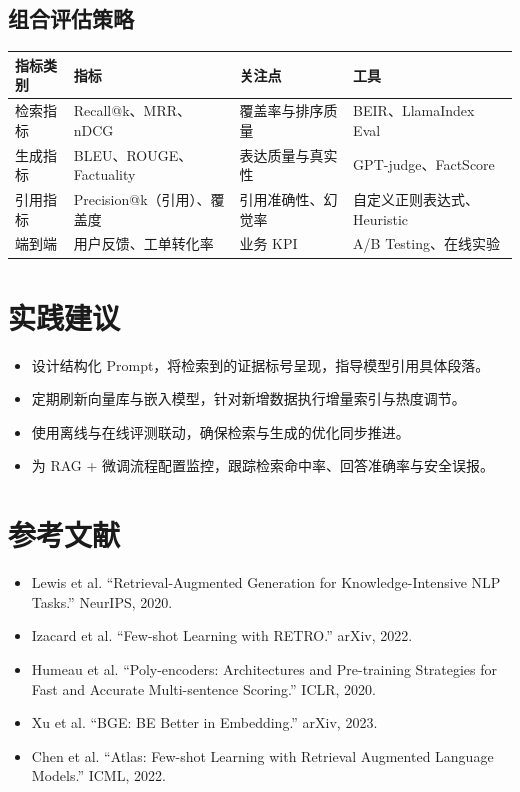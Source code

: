 \documentclass[UTF8,zihao=-4]{ctexart}
\begin{document}
\subsection{组合评估策略}
\begin{longtable}{p{3cm}p{3cm}p{4cm}p{4cm}}
\toprule
指标类别 & 指标 & 关注点 & 工具 \\
\midrule
检索指标 & Recall@k、MRR、nDCG & 覆盖率与排序质量 & BEIR、LlamaIndex Eval \\
生成指标 & BLEU、ROUGE、Factuality & 表达质量与真实性 & GPT-judge、FactScore \\
引用指标 & Precision@k（引用）、覆盖度 & 引用准确性、幻觉率 & 自定义正则表达式、Heuristic \\
端到端 & 用户反馈、工单转化率 & 业务 KPI & A/B Testing、在线实验 \\
\bottomrule
\end{longtable}

\section*{实践建议}
\begin{itemize}
  \item 设计结构化 Prompt，将检索到的证据标号呈现，指导模型引用具体段落。
  \item 定期刷新向量库与嵌入模型，针对新增数据执行增量索引与热度调节。
  \item 使用离线与在线评测联动，确保检索与生成的优化同步推进。
  \item 为 RAG + 微调流程配置监控，跟踪检索命中率、回答准确率与安全误报。
\end{itemize}

\section*{参考文献}
\begin{itemize}
  \item Lewis et al. ``Retrieval-Augmented Generation for Knowledge-Intensive NLP Tasks.'' NeurIPS, 2020.
  \item Izacard et al. ``Few-shot Learning with RETRO.'' arXiv, 2022.
  \item Humeau et al. ``Poly-encoders: Architectures and Pre-training Strategies for Fast and Accurate Multi-sentence Scoring.'' ICLR, 2020.
  \item Xu et al. ``BGE: BE Better in Embedding.'' arXiv, 2023.
  \item Chen et al. ``Atlas: Few-shot Learning with Retrieval Augmented Language Models.'' ICML, 2022.
\end{itemize}
\end{document}
